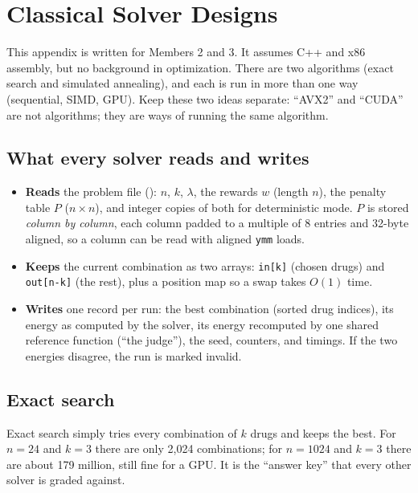 \section{Classical Solver Designs}
\label{app:classical}

This appendix is written for Members 2 and 3. It assumes C++ and x86 assembly, but no background in optimization. There are two algorithms (exact search and simulated annealing), and each is run in more than one way (sequential, SIMD, GPU). Keep these two ideas separate: ``AVX2'' and ``CUDA'' are not algorithms; they are ways of running the same algorithm.

\subsection{What every solver reads and writes}

\begin{itemize}
\item \textbf{Reads} the problem file (): $n$, $k$, $\lambda$, the rewards $w$ (length $n$), the penalty table $P$ ($n\times n$), and integer copies of both for deterministic mode. $P$ is stored \emph{column by column}, each column padded to a multiple of 8 entries and 32-byte aligned, so a column can be read with aligned \texttt{ymm} loads.
\item \textbf{Keeps} the current combination as two arrays: \texttt{in[k]} (chosen drugs) and \texttt{out[n-k]} (the rest), plus a position map so a swap takes $O(1)$ time.
\item \textbf{Writes} one record per run: the best combination (sorted drug indices), its energy as computed by the solver, its energy recomputed by one shared reference function (``the judge''), the seed, counters, and timings. If the two energies disagree, the run is marked invalid.
\end{itemize}

\subsection{Exact search}

\begin{plainwords}
Exact search simply tries every combination of $k$ drugs and keeps the best. For $n=24$ and $k=3$ there are only 2{,}024 combinations; for $n=1024$ and $k=3$ there are about 179 million, still fine for a GPU. It is the ``answer key'' that every other solver is graded against.
\end{plainwords}

